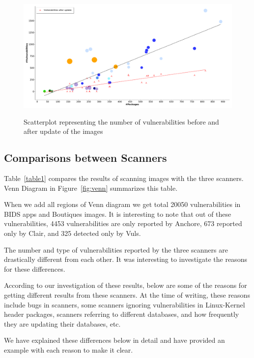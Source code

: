 \documentclass[a4paper,num-refs]{oup-contemporary}
\begin{document}
\begin{figure}[b]
        {\includegraphics[width=\textwidth]
        {Figures/vulnwithupdate.pdf}}
        \caption{\label{fig:graph2} Scatterplot representing the number of vulnerabilities before and
        after update of the images}
      \end{figure}

\subsection{Comparisons between Scanners}

Table~\ref{table1} compares the results of scanning images with the three scanners.
Venn Diagram in Figure~\ref{fig:venn} summarizes this table. 

When we add all regions of Venn diagram
we get total 20050 vulnerabilities in BIDS apps and Boutiques images.
It is interesting to note that out of these vulnerabilities, 4453 vulnerabilities are only
reported by Anchore, 673 reported only by Clair, and 325 detected only by Vuls.

The number and type of vulnerabilities reported by the three scanners are drastically different from each other.
It was interesting to investigate the reasons for these differences.

According to our investigation of these results, below are some of the reasons for
getting different results from these scanners. At the time of writing, these reasons include bugs in scanners,
some scanners ignoring vulnerabilities in Linux-Kernel header packages, scanners referring to different databases,
and how frequently they are updating their databases, etc. 

We have explained these differences below in detail
and have provided an example with each reason to make it clear.
\end{document}
